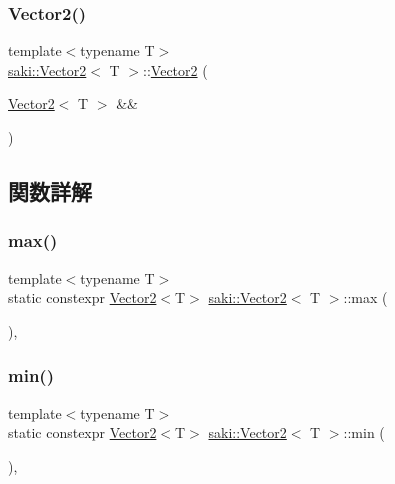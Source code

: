 \subsubsection{\texorpdfstring{Vector2()}{Vector2()}\hspace{0.1cm}{\footnotesize\ttfamily [4/4]}}
{\footnotesize\ttfamily template$<$typename T$>$ \\
\mbox{\hyperlink{classsaki_1_1_vector2}{saki\+::\+Vector2}}$<$ T $>$\+::\mbox{\hyperlink{classsaki_1_1_vector2}{Vector2}} (\begin{DoxyParamCaption}\item[{\mbox{\hyperlink{classsaki_1_1_vector2}{Vector2}}$<$ T $>$ \&\&}]{ }\end{DoxyParamCaption})\hspace{0.3cm}{\ttfamily [default]}}



\subsection{関数詳解}
\mbox{\label{classsaki_1_1_vector2_ad0c75c5cf88476643a5cb31e522e065b}} 
\subsubsection{\texorpdfstring{max()}{max()}}
{\footnotesize\ttfamily template$<$typename T$>$ \\
static constexpr \mbox{\hyperlink{classsaki_1_1_vector2}{Vector2}}$<$T$>$ \mbox{\hyperlink{classsaki_1_1_vector2}{saki\+::\+Vector2}}$<$ T $>$\+::max (\begin{DoxyParamCaption}{ }\end{DoxyParamCaption})\hspace{0.3cm}{\ttfamily [inline]}, {\ttfamily [static]}}

\mbox{\label{classsaki_1_1_vector2_a8ad62d4709258510a229f08ea7db14c8}} 
\subsubsection{\texorpdfstring{min()}{min()}}
{\footnotesize\ttfamily template$<$typename T$>$ \\
static constexpr \mbox{\hyperlink{classsaki_1_1_vector2}{Vector2}}$<$T$>$ \mbox{\hyperlink{classsaki_1_1_vector2}{saki\+::\+Vector2}}$<$ T $>$\+::min (\begin{DoxyParamCaption}{ }\end{DoxyParamCaption})\hspace{0.3cm}{\ttfamily [inline]}, {\ttfamily [static]}}

